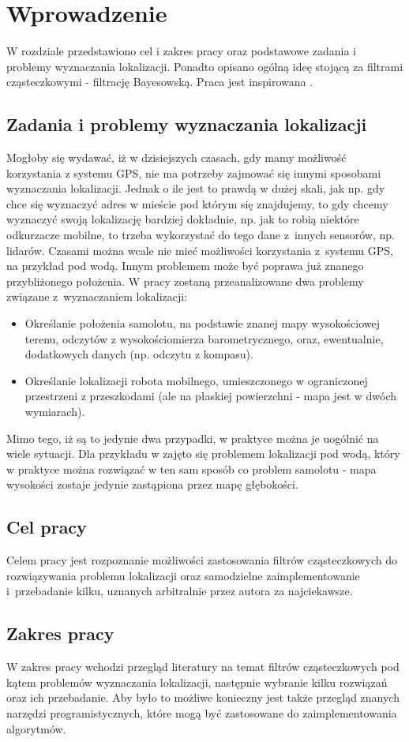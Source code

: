 \chapter{Wprowadzenie}
W rozdziale przedstawiono cel i zakres pracy oraz podstawowe zadania i problemy wyznaczania lokalizacji. Ponadto opisano ogólną ideę stojącą za filtrami cząsteczkowymi - filtrację Bayesowską. Praca jest inspirowana \cite{appl3}.
\section{Zadania i problemy wyznaczania lokalizacji}
Mogłoby się wydawać, iż w dzisiejszych czasach, gdy mamy możliwość korzystania z systemu GPS, nie ma potrzeby zajmować się innymi sposobami wyznaczania lokalizacji. Jednak o ile jest to prawdą w dużej skali, jak np. gdy chce się wyznaczyć adres w mieście pod którym się znajdujemy, to gdy chcemy wyznaczyć swoją lokalizację bardziej dokładnie, np. jak to robią niektóre odkurzacze mobilne, to trzeba wykorzystać do tego dane z~innych sensorów, np. lidarów. Czasami można wcale nie mieć możliwości korzystania z~systemu GPS, na przykład pod wodą. Innym problemem może być poprawa już znanego przybliżonego położenia. W pracy zostaną przeanalizowane dwa problemy związane z~wyznaczaniem lokalizacji:
\begin{itemize}
	\item Określanie położenia samolotu, na podstawie znanej mapy wysokościowej terenu, odczytów z wysokościomierza barometrycznego, oraz, ewentualnie, dodatkowych danych (np. odczytu z kompasu). 
	\item Określanie lokalizacji robota mobilnego, umieszczonego w ograniczonej przestrzeni z przeszkodami (ale na płaskiej powierzchni - mapa jest w dwóch wymiarach).
\end{itemize}
Mimo tego, iż są to jedynie dwa przypadki, w praktyce można je uogólnić na wiele sytuacji. Dla przykładu w \cite{underwater_pf} zajęto się problemem lokalizacji pod wodą, który w praktyce można rozwiązać w ten sam sposób co problem samolotu - mapa wysokości zostaje jedynie zastąpiona przez mapę głębokości.
\section{Cel pracy}
Celem pracy jest rozpoznanie możliwości zastosowania filtrów cząsteczkowych do rozwiązywania problemu lokalizacji oraz samodzielne zaimplementowanie i~przebadanie kilku, uznanych arbitralnie przez autora za najciekawsze.
\section{Zakres pracy}
W zakres pracy wchodzi przegląd literatury na temat filtrów cząsteczkowych pod kątem problemów wyznaczania lokalizacji, następnie wybranie kilku rozwiązań oraz ich przebadanie. Aby było to możliwe konieczny jest także przegląd znanych narzędzi programistycznych, które mogą być zastosowane do zaimplementowania algorytmów.

